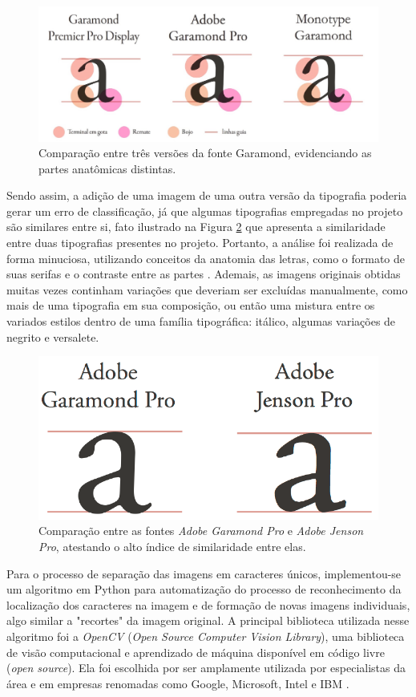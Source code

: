 \begin{figure}[h!]
  \centering
  \includegraphics[width=0.65\linewidth]{figuras/comparacaoTipo.pdf}
  \caption{Comparação entre três versões da fonte Garamond, evidenciando as partes anatômicas distintas.}
  \label{fig:comparacaoTipos}
\end{figure}

Sendo assim, a adição de uma imagem de uma outra versão da tipografia poderia gerar um erro de classificação, já que algumas tipografias empregadas no projeto são similares entre si, fato ilustrado na Figura \ref{fig:comparacaoJensonGaramond} que apresenta a similaridade entre duas tipografias presentes no projeto. Portanto, a análise foi realizada de forma minuciosa, utilizando conceitos da anatomia das letras, como o formato de suas serifas e o contraste entre as partes . Ademais, as imagens originais obtidas muitas vezes continham variações que deveriam ser excluídas manualmente, como mais de uma tipografia em sua composição, ou então uma mistura entre os variados estilos dentro de uma família tipográfica: itálico, algumas variações de negrito e versalete.

\begin{figure}[H]
  \centering
  \includegraphics[width=0.4\linewidth]{figuras/comparacaoJensonGaramond.pdf}
  \caption{Comparação entre as fontes \textit{Adobe Garamond Pro} e \textit{Adobe Jenson Pro}, atestando o alto índice de similaridade entre elas.}
  \label{fig:comparacaoJensonGaramond}
\end{figure}

Para o processo de separação das imagens em caracteres únicos, implementou-se um algoritmo em Python para automatização do processo de reconhecimento da localização dos caracteres na imagem e de formação de novas imagens individuais, algo similar a "recortes" {} da imagem original. A principal biblioteca utilizada nesse algoritmo foi a \textit{OpenCV} (\textit{Open Source Computer Vision Library}), uma biblioteca de visão computacional e aprendizado de máquina disponível em código livre (\textit{open source}). Ela foi escolhida por ser amplamente utilizada por especialistas da área e em empresas renomadas como Google, Microsoft, Intel e IBM .

